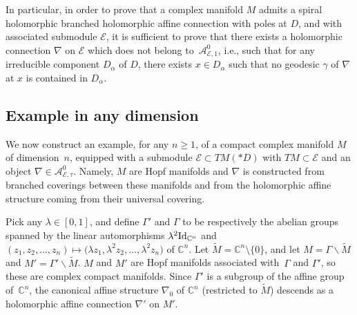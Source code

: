 \documentclass[10pt,a4paper]{amsart}
\numberwithin{equation}{section}
\begin{document}
In particular, in order to prove that a complex manifold $M$ admits a spiral holomorphic branched holomorphic affine connection with poles at $D$, and with associated submodule $\mathcal{E}$, it is sufficient to prove that there exists a holomorphic connection $\nabla$ on $\mathcal{E}$ which does not belong to~$\mathcal{A}^0_{\mathcal{E},1}$, i.e., such that for any irreducible component $D_\alpha$ of $D$, there exists $x\in D_\alpha$ such that no geodesic $\gamma$ of $\nabla$ at $x$ is contained in $D_\alpha$.

\subsection{Example in any dimension}
We now construct an example, for any $n\geq 1$, of a compact complex manifold $M$ of dimension~$n$, equipped with a submodule $\mathcal{E}\subset TM(* D)$ with $TM\subset \mathcal{E}$ and an object $\nabla \in \mathcal{A}^0_{\mathcal{E},\tau}$. Namely, $M$ are Hopf manifolds and $\nabla$ is constructed from branched coverings between these manifolds and from the holomorphic affine structure coming from their universal covering.

Pick any $\lambda \in [0,1]$, and define $\Gamma'$ and $\Gamma$ to be respectively the abelian groups spanned by the linear automorphisms $\lambda^2 {\rm Id}_{\mathbb{C}^n}$ and $(z_1,z_2,\dots,z_n)\mapsto \big(\lambda z_1, \lambda^2 z_2,\dots,\lambda^2 z_n\big)$ of $\mathbb{C}^n$. Let $\tilde{M}=\mathbb{C}^n \setminus \{0\}$, and let $M=\Gamma \backslash \tilde{M}$ and $M' = \Gamma' \backslash \tilde{M}$. $M$ and $M'$ are Hopf manifolds associated with~$\Gamma$ and $\Gamma'$, so these are complex compact manifolds. Since $\Gamma'$ is a subgroup of the affine group of~$\mathbb{C}^n$, the canonical affine structure $\nabla_0$ of $\mathbb{C}^n$ \big(restricted to $\tilde{M}$\big) descends as a holomorphic affine connection $\nabla'$ on $M'$.
\end{document}
